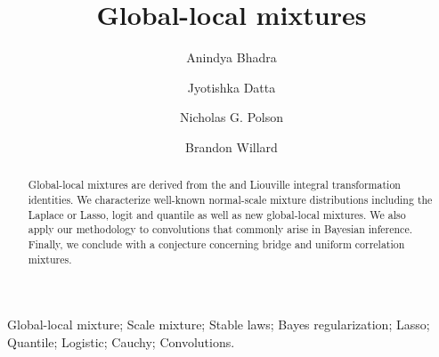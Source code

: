 \documentclass[lineno]{biometrika}
\begin{document}



\title{Global-local mixtures}

\author{Anindya Bhadra}
\author{Jyotishka Datta}
\author{Nicholas G. Polson \and Brandon Willard }


\maketitle
\begin{abstract}
  Global-local mixtures are derived from the \CS{} and Liouville integral transformation identities. We characterize well-known normal-scale mixture
  distributions including the Laplace or Lasso, logit and quantile as well as new global-local mixtures. We also apply our methodology to convolutions that
  commonly arise in Bayesian inference. Finally, we conclude with a conjecture concerning bridge and uniform correlation mixtures. 
\end{abstract}

\begin{keywords}
Global-local mixture; Scale mixture; Stable laws; Bayes regularization; Lasso; Quantile; Logistic; Cauchy; Convolutions. 
\end{keywords}
\end{document}
